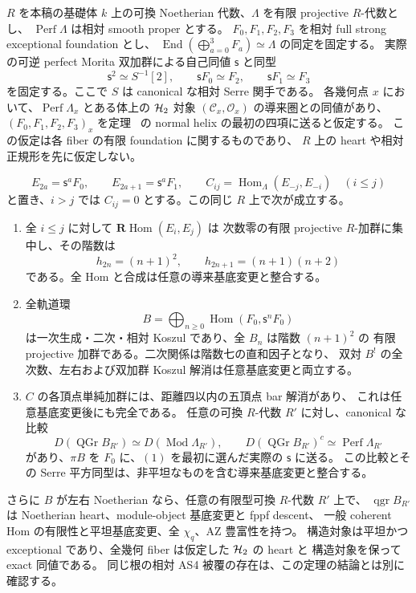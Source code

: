 \begin{theorem}
\label{thm:uniform-orbit-from-normal-fibers}
$R$ を本稿の基礎体 $k$ 上の可換 Noetherian 代数、$\Lambda$ を有限 projective $R$-代数とし、
$\operatorname{Perf}\Lambda$ は相対 smooth proper とする。
$F_0,F_1,F_2,F_3$ を相対 full strong exceptional foundation とし、
$\operatorname{End}(\bigoplus_{a=0}^3F_a)\simeq\Lambda$ の同定を固定する。
実際の可逆 perfect Morita 双加群による自己同値 $\mathsf s$ と同型
\[
 \mathsf s^2\simeq S^{-1}[2],\qquad
 \mathsf sF_0\simeq F_2,\qquad \mathsf sF_1\simeq F_3
\]
を固定する。ここで $S$ は canonical な相対 Serre 関手である。
各幾何点 $x$ において、$\operatorname{Perf}\Lambda_x$ とある体上の
$\mathcal H_2$ 対象 $(\mathcal C_x,\mathcal O_x)$ の導来圏との同値があり、
$(F_0,F_1,F_2,F_3)_x$ を定理~\cite[\texttt{thm:normal-helix}]{QuadricIntrinsic2026} の
normal helix の最初の四項に送ると仮定する。
この仮定は各 fiber の有限 foundation に関するものであり、
$R$ 上の heart や相対正規形を先に仮定しない。

\[
 E_{2a}=\mathsf s^aF_0,\qquad E_{2a+1}=\mathsf s^aF_1,
 \qquad C_{ij}=\operatorname{Hom}_{\Lambda}(E_{-j},E_{-i})\quad(i\le j)
\]
と置き、$i>j$ では $C_{ij}=0$ とする。この同じ $R$ 上で次が成立する。
\begin{enumerate}
\item 全 $i\le j$ に対して $\mathbf R\operatorname{Hom}(E_i,E_j)$ は
  次数零の有限 projective $R$-加群に集中し、その階数は
  \[
  h_{2n}=(n+1)^2,\qquad h_{2n+1}=(n+1)(n+2)
  \]
  である。全 Hom と合成は任意の導来基底変更と整合する。
\item 全軌道環
  \[
  B=\bigoplus_{n\ge0}\operatorname{Hom}(F_0,\mathsf s^nF_0)
  \]
  は一次生成・二次・相対 Koszul であり、全 $B_n$ は階数 $(n+1)^2$ の
  有限 projective 加群である。二次関係は階数七の直和因子となり、
  双対 $B^!$ の全次数、左右および双加群 Koszul 解消は任意基底変更と両立する。
\item $C$ の各頂点単純加群には、距離四以内の五頂点 bar 解消があり、
  これは任意基底変更後にも完全である。
  任意の可換 $R$-代数 $R'$ に対し、canonical な比較
  \[
  D(\operatorname{QGr}B_{R'})\simeq D(\operatorname{Mod}\Lambda_{R'}),
  \qquad D(\operatorname{QGr}B_{R'})^c\simeq\operatorname{Perf}\Lambda_{R'}
  \]
  があり、$\pi B$ を $F_0$ に、$(1)$ を最初に選んだ実際の $\mathsf s$ に送る。
  この比較とその Serre 平方同型は、非平坦なものを含む導来基底変更と整合する。
\end{enumerate}
さらに $B$ が左右 Noetherian なら、任意の有限型可換 $R$-代数 $R'$ 上で、
$\operatorname{qgr}B_{R'}$ は Noetherian heart、module-object 基底変更と fppf descent、
一般 coherent Hom の有限性と平坦基底変更、全 $\chi_q$、AZ 豊富性を持つ。
構造対象は平坦かつ exceptional であり、全幾何 fiber は仮定した $\mathcal H_2$ の heart と
構造対象を保って exact 同値である。
同じ根の相対 AS4 被覆の存在は、この定理の結論とは別に確認する。
\end{theorem}


